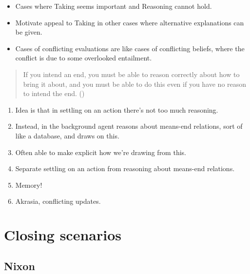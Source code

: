 \documentclass[10pt]{article}
\newcommand{\hand}{\ding{43}}
\newcommand{\hozlinedash}[0]{%
  \noindent\hdashrule[0.5ex][c]{\textwidth}{.1pt}{2.5pt}
}
\newcommand{\schemaName}[1]{\textsf{#1}}
\begin{document}
\begin{itemize}
\item[\hand] Cases where \schemaName{Taking} seems important and \schemaName{Reasoning} cannot hold.
\item Motivate appeal to \schemaName{Taking} in other cases where alternative explanations can be given.
\end{itemize}






\begin{itemize}
\item Cases of conflicting evaluations are like cases of conflicting beliefs, where the conflict is due to some overlooked entailment.
\end{itemize}



\begin{quote}
  If you intend an end, you must be able to reason correctly about how to bring it about, and you must be able to do this even if you have no reason to intend the end.\nolinebreak
  \mbox{}\hfill\mbox{(\citeyear[96]{Broome:2002aa})}
\end{quote}

\hozlinedash

\begin{enumerate}
\item Idea is that in settling on an action there's not too much reasoning.
\item Instead, in the background agent reasons about means-end relations, sort of like a database, and draws on this.
\item Often able to make explicit how we're drawing from this.
\item Separate settling on an action from reasoning about means-end relations.
\item Memory!
\item Akrasia, conflicting updates.
\end{enumerate}

\newpage

\section{Closing scenarios}
\label{sec:closing-scenarios}

\subsection{Nixon}
\label{sec:nixon}
\end{document}
